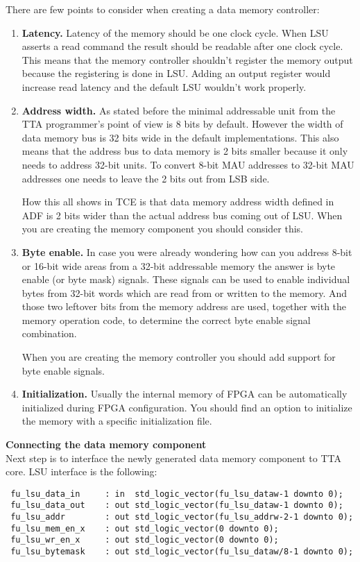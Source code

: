 \documentclass[twoside]{tceusermanual}
\begin{document}
There are few points to consider when creating a data memory controller:
\begin{enumerate}
 \item%
 \textbf{Latency.} Latency of the memory should be one clock cycle. When LSU 
 asserts a read command the result should be readable after one clock
 cycle. This means that the memory controller shouldn't register the memory
 output because the registering is done in LSU. Adding an output register
 would increase read latency and the default LSU wouldn't work properly.
\item%
 \textbf{Address width.}
 As stated before the minimal addressable unit from the TTA programmer's point
 of view is 8 bits by default. However the width of data memory bus is 32 bits
 wide in the default implementations. This also means that the address bus to
 data memory is 2 bits smaller because it only needs to address 32-bit units.
 To convert 8-bit MAU addresses to 32-bit MAU addresses one needs to leave the
 2 bits out from LSB side.

 How this all shows in TCE is that data memory address width defined in ADF is
 2 bits wider than the actual address bus coming out of LSU. When you are
 creating the memory component you should consider this.
\item%
 \textbf{Byte enable.}
 In case you were already wondering how can you address 8-bit or 16-bit wide
 areas from a 32-bit addressable memory the answer is byte enable (or byte
 mask) signals. These signals can be used to enable individual bytes from
 32-bit words which are read from or written to the memory. And those two
 leftover bits from the memory address are used, together with the memory
 operation code, to determine the correct byte enable signal combination.

 When you are creating the memory controller you should add support for byte
 enable signals.
\item%
 \textbf{Initialization.}
 Usually the internal memory of FPGA can be automatically initialized during
 FPGA configuration. You should find an option to initialize the memory with
 a specific initialization file.
\end{enumerate}

\textbf{Connecting the data memory component} \\
Next step is to interface the newly generated data memory component to TTA
core. LSU interface is the following:
\begin{verbatim}
 fu_lsu_data_in     : in  std_logic_vector(fu_lsu_dataw-1 downto 0);
 fu_lsu_data_out    : out std_logic_vector(fu_lsu_dataw-1 downto 0);
 fu_lsu_addr        : out std_logic_vector(fu_lsu_addrw-2-1 downto 0);
 fu_lsu_mem_en_x    : out std_logic_vector(0 downto 0);
 fu_lsu_wr_en_x     : out std_logic_vector(0 downto 0);
 fu_lsu_bytemask    : out std_logic_vector(fu_lsu_dataw/8-1 downto 0);
\end{verbatim}
\end{document}
